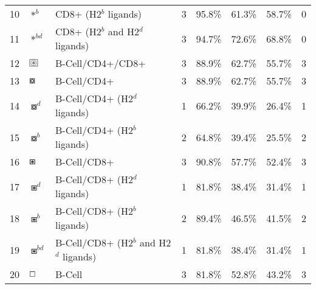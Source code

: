 \begin{tabular}{rllccccc}
10 &                                           $ \ast^b $ &                    CD8+ (H2$^b$ ligands) &            3 &         95.8\% &          61.3\% &         58.7\% &                          0 \\
11 &                                        $ \ast^{bd} $ &         CD8+ (H2$^b$ and H2$^d$ ligands) &            3 &         94.7\% &          72.6\% &         68.8\% &                          0 \\
12 &  $ \setlength{\fboxsep}{0.5pt} \boxed{\circledast} $ &                         B-Cell/CD4+/CD8+ &            3 &         88.9\% &          62.7\% &         55.7\% &                          3 \\
13 &                                       $ \boxcircle $ &                              B-Cell/CD4+ &            3 &         88.9\% &          62.7\% &         55.7\% &                          3 \\
14 &                                     $ \boxcircle^d $ &             B-Cell/CD4+ (H2$^d$ ligands) &            1 &         66.2\% &          39.9\% &         26.4\% &                          1 \\
15 &                                     $ \boxcircle^b $ &             B-Cell/CD4+ (H2$^b$ ligands) &            2 &         64.8\% &          39.4\% &         25.5\% &                          2 \\
16 &                                          $ \boxast $ &                              B-Cell/CD8+ &            3 &         90.8\% &          57.7\% &         52.4\% &                          3 \\
17 &                                        $ \boxast^d $ &             B-Cell/CD8+ (H2$^d$ ligands) &            1 &         81.8\% &          38.4\% &         31.4\% &                          1 \\
18 &                                        $ \boxast^b $ &             B-Cell/CD8+ (H2$^b$ ligands) &            2 &         89.4\% &          46.5\% &         41.5\% &                          2 \\
19 &                                     $ \boxast^{bd} $ &  B-Cell/CD8+ (H2$^b$ and H2$^d$ ligands) &            1 &         81.8\% &          38.4\% &         31.4\% &                          1 \\
20 &                                        $ \boxempty $ &                                   B-Cell &            3 &         81.8\% &          52.8\% &         43.2\% &                          3 \\

\end{tabular}
